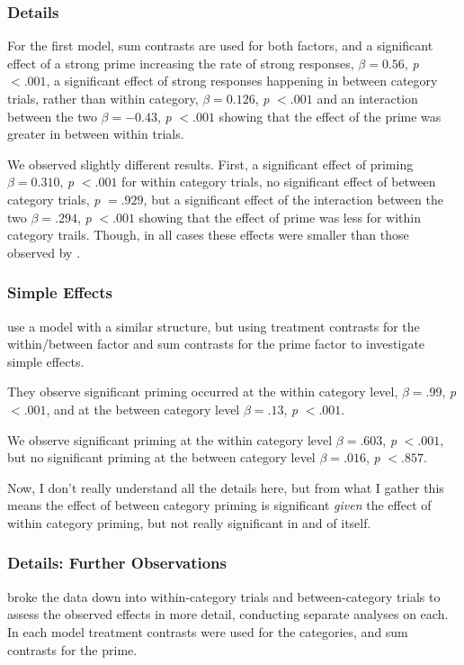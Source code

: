 \documentclass[noamssymb]{beamer}
\begin{document}
\begin{frame}
  \frametitle{{\ftf Details}}

  For the first model, sum contrasts are used for both factors, and a significant effect of a strong prime increasing the rate of strong responses, \(\beta = 0.56\), \emph{p} \(< .001\), a significant effect of strong responses happening in between category trials, rather than within category, \(\beta = 0.126\), \emph{p} \(< .001\) and an interaction between the two \(\beta = -0.43\), \emph{p} \(< .001\) showing that the effect of the prime was greater in between within trials.

We observed slightly different results.
First, a significant effect of priming \(\beta = 0.310\), \emph{p} \(<.001\) for within category trials, no significant effect of between category trials, \emph{p} \(= .929\), but a significant effect of the interaction between the two \(\beta = .294\), \emph{p} \(<.001\) showing that the effect of prime was less for within category trails.
Though, in all cases these effects were smaller than those observed by \citeauthor{Bott:2016aa}.
\end{frame}

\begin{frame}
  \frametitle{{\ftf Simple Effects}}
  \citeauthor{Bott:2016aa} use a model with a similar structure, but using treatment contrasts for the within/between factor and sum contrasts for the prime factor to investigate simple effects.

  They observe significant priming occurred at the within category level, \(\beta = .99\), \emph{p} \(< .001\), and at the between category level \(\beta = .13\), \emph{p} \(< .001\).

  We observe significant priming at the within category level \(\beta = .603\), \emph{p} \(<.001\), but no significant priming at the between category level \(\beta = .016\), \emph{p} \(< .857\).

  Now, I don't really understand all the details here, but from what I gather this means the effect of between category priming is significant \emph{given} the effect of within category priming, but not really significant in and of itself.

\end{frame}


\begin{frame}
  \frametitle{{\ftf Details: Further Observations}}

  \citeauthor{Bott:2016aa} broke the data down into within-category trials and between-category trials to assess the observed effects in more detail, conducting separate analyses on each.
  In each model treatment contrasts were used for the categories, and sum contrasts for the prime.

\end{frame}
\end{document}
